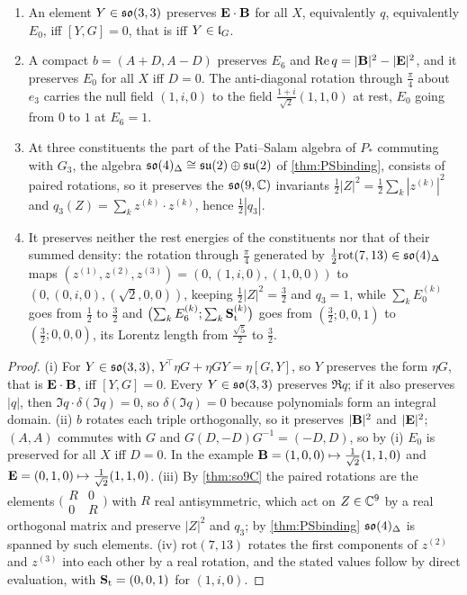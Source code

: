 \begin{proposition}
\label{en:transport}
\begin{enumerate}[label=(\roman*),leftmargin=2.2em]
\item An element $Y\in\mathfrak{so}(3,3)$ preserves $\mathbf E\cdot\mathbf B$ for all $X$, equivalently $q$, equivalently $E_0$, iff $[Y,G]=0$, that is iff $Y\in\mathfrak l_G$.
\item A compact $b=(A+D,A-D)$ preserves $E_6$ and $\operatorname{Re} q=|\mathbf B|^2-|\mathbf E|^2$, and it preserves $E_0$ for all $X$ iff $D=0$. The anti-diagonal
rotation through $\tfrac\pi4$ about $e_3$ carries the null field $(1,i,0)$ to the field $\tfrac{1+i}{\sqrt2}(1,1,0)$ at rest, $E_0$ going from $0$ to $1$
at $E_6=1$.
\item At three constituents the part of the Pati--Salam algebra of $P_*$ commuting with $G_3$, the algebra $\mathfrak{so}(4)_\Delta\cong\mathfrak{su}(2)\oplus\mathfrak{su}(2)$ of
\cref{thm:PSbinding}, consists of paired rotations, so it preserves the $\mathfrak{so}(9,\mathbb{C})$ invariants $\tfrac12|Z|^2=\tfrac12\sum_k|z^{(k)}|^2$ and
$q_3(Z)=\sum_kz^{(k)}\cdot z^{(k)}$, hence $\tfrac12|q_3|$.
\item It preserves neither the rest energies of the constituents nor that of their summed density: the rotation through $\tfrac\pi4$ generated by
$\tfrac12\mathrm{rot}(7,13)\in\mathfrak{so}(4)_\Delta$ maps $(z^{(1)},z^{(2)},z^{(3)})=(0,(1,i,0),(1,0,0))$ to $(0,(0,i,0),(\sqrt2,0,0))$, keeping
$\tfrac12|Z|^2=\tfrac32$ and $q_3=1$, while $\sum_kE_0^{(k)}$ goes from $\tfrac12$ to $\tfrac32$ and
$\bigl(\sum_kE_6^{(k)};\sum_k\mathbf S_{\rm t}^{(k)}\bigr)$ goes from $(\tfrac32;0,0,1)$ to $(\tfrac32;0,0,0)$, its Lorentz length from $\tfrac{\sqrt5}2$
to $\tfrac32$.
\end{enumerate}
\end{proposition}

\begin{proof}
(i) For $Y\in\mathfrak{so}(3,3)$, $Y^{\!\top}\eta G+\eta GY=\eta[G,Y]$, so $Y$ preserves the form $\eta G$, that is $\mathbf E\cdot\mathbf B$, iff $[Y,G]=0$. Every $Y\in\mathfrak{so}(3,3)$
preserves $\Re q$; if it also preserves $|q|$, then $\Im q\cdot\delta(\Im q)=0$, so $\delta(\Im q)=0$ because polynomials form an integral domain. (ii)
$b$ rotates each triple orthogonally, so it preserves $|\mathbf B|^2$ and $|\mathbf E|^2$; $(A,A)$ commutes with $G$ and $G(D,-D)G^{-1}=(-D,D)$, so by (i) $E_0$ is
preserved for all $X$ iff $D=0$. In the example $\mathbf B=(1,0,0)\mapsto\tfrac1{\sqrt2}(1,1,0)$ and $\mathbf E=(0,1,0)\mapsto\tfrac1{\sqrt2}(1,1,0)$. (iii) By
\cref{thm:so9C} the paired rotations are the elements $\bigl(\begin{smallmatrix}R&0\\0&R\end{smallmatrix}\bigr)$ with $R$ real antisymmetric, which act on
$Z\in\mathbb{C}^9$ by a real orthogonal matrix and preserve $|Z|^2$ and $q_3$; by \cref{thm:PSbinding} $\mathfrak{so}(4)_\Delta$ is spanned by such elements. (iv)
$\mathrm{rot}(7,13)$ rotates the first components of $z^{(2)}$ and $z^{(3)}$ into each other by a real rotation, and the stated values follow by
direct evaluation, with $\mathbf S_{\rm t}=(0,0,1)$ for $(1,i,0)$.
\end{proof}


